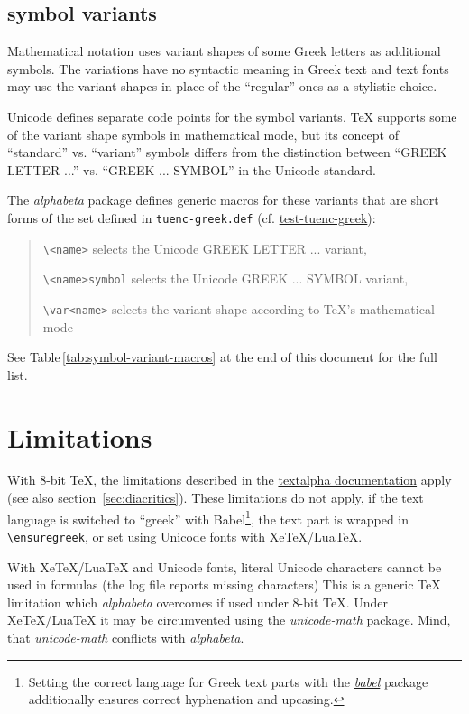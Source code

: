 \documentclass[a4paper]{scrartcl}
\newcommand{\file}{\texttt}
\newcommand{\pkgref}[1]{\emph{\href{https://ctan.org/pkg/#1}{#1}}}
\begin{document}
\subsection{symbol variants \label{sec:symbol-variants}}

Mathematical notation uses variant shapes of some Greek letters as
additional symbols. The variations have no syntactic meaning in Greek text
and text fonts may use the variant shapes in place of the “regular” ones as
a stylistic choice.

Unicode defines separate code points for the symbol variants. TeX supports
some of the variant shape symbols in mathematical mode, but its concept of
“standard” vs. “variant” symbols differs from the distinction between
“GREEK LETTER ...” vs. “GREEK ... SYMBOL” in the Unicode standard.

The \emph{alphabeta} package defines generic macros for these variants that
are short forms of the set defined in \file{tuenc-greek.def}
(cf. \href{test-tuenc-greek.pdf}{test-tuenc-greek}):
\begin{quote}
  \verb|\<name>| selects the Unicode GREEK LETTER ... variant,

  \verb|\<name>symbol| selects the Unicode
     GREEK ... SYMBOL variant,

  \verb|\var<name>| selects the variant
    shape according to TeX's mathematical mode
\end{quote}
See Table\,\ref{tab:symbol-variant-macros} at the end of this document for
the full list.


\section{Limitations \label{sec:limitations}}

With 8-bit TeX, the limitations described in the
\href{textalpha-doc.pdf}{textalpha documentation} apply
(see also section~\ref{sec:diacritics}).
These limitations do not apply, if the text language is switched to ``greek''
with Babel\footnote{\label{footnote:babel-greek}
  Setting the correct language for Greek text parts with the
  \pkgref{babel} package additionally ensures correct hyphenation and
  upcasing.},
the text part is wrapped in \verb+\ensuregreek+,
or set using Unicode fonts with XeTeX/LuaTeX.

With XeTeX/LuaTeX and Unicode fonts, literal Unicode characters cannot be
used in formulas (the log file reports missing characters) This is a generic
TeX limitation which \emph{alphabeta} overcomes if used under 8-bit TeX.
Under XeTeX/LuaTeX it may be circumvented using the \pkgref{unicode-math}
package. Mind, that \emph{unicode-math} conflicts with \emph{alphabeta}.
\end{document}
